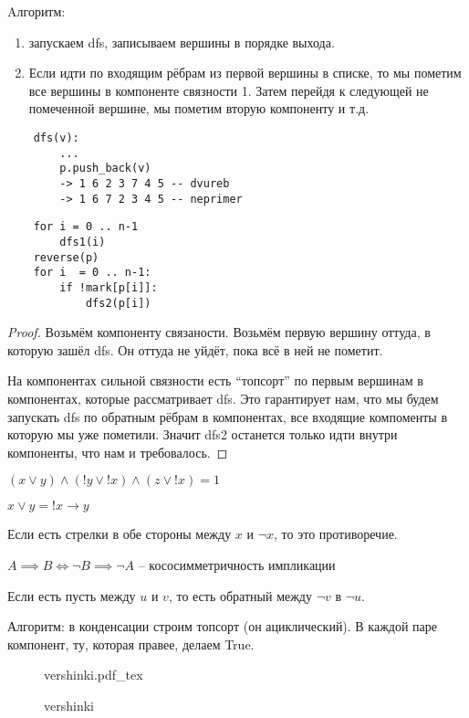 \documentclass{book}
\theoremstyle{definition}
\newcommand{\incfig}[1]{%
    \def\svgwidth{\columnwidth}
    {#1.pdf_tex}
}
\begin{document}
Aлгоритм:
\begin{enumerate}
    \item запускаем dfs, записываем вершины в порядке выхода. 
    \item Если идти по входящим рёбрам из первой вершины в списке, то мы пометим все вершины в компоненте связности 1. Затем перейдя к следующей не помеченной вершине, мы пометим вторую компоненту и т.д.
\end{enumerate}
\begin{lstlisting}
    dfs(v):
        ...
        p.push_back(v)
        -> 1 6 2 3 7 4 5 -- dvureb
        -> 1 6 7 2 3 4 5 -- neprimer
\end{lstlisting}

\begin{lstlisting}
    for i = 0 .. n-1
        dfs1(i)
    reverse(p)
    for i  = 0 .. n-1:
        if !mark[p[i]]:
            dfs2(p[i])
\end{lstlisting}
\begin{proof}
    Возьмём компоненту связаности. Возьмём первую вершину оттуда, в которую зашёл dfs. Он оттуда не уйдёт, пока всё в ней не пометит. 

    На компонентах сильной связности есть ``топсорт'' по первым вершинам в компонентах, которые рассматривает dfs. Это гарантирует нам, что мы будем запускать dfs по обратным рёбрам в компонентах, все входящие компоменты в которую мы уже пометили. Значит dfs2 останется только идти внутри компоненты, что нам и требовалось.
\end{proof}


\begin{problem}
    [2-SAT]    
$(x\vee y)\land(!y\lor !x)\land(z\lor !x) = 1 $

$x\lor y = !x \to y$

Если есть стрелки в обе стороны между  $x $ и  $\neg x$, то это противоречие.

$A \implies B \iff  \neg B \implies \neg A $ -- кососимметричность импликации

Если есть пусть между $u$ и  $v$, то есть обратный между  $\neg v$ в  $\neg u$.

Алгоритм:
в конденсации строим топсорт (он ациклический). В каждой паре компонент, ту, которая правее, делаем True.
\end{problem}

\begin{figure}[!ht]
    \centering
    \incfig{vershinki}
    \caption{vershinki}
    \label{fig:vershinki}
\end{figure}
\end{document}
